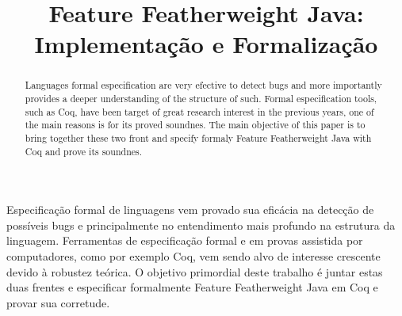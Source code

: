 \documentclass[bacharelado]{unb-cic}
\title{Feature Featherweight Java: Implementação e Formalização}
\begin{document}
  \maketitle
  \pretextual



  \begin{resumo}
  Especificação formal de linguagens vem provado sua eficácia na detecção de possíveis bugs e principalmente no entendimento mais profundo na estrutura da linguagem. Ferramentas de especificação formal e em provas assistida por computadores, como por exemplo Coq, vem sendo alvo de interesse crescente devido à robustez teórica. O objetivo primordial deste trabalho é juntar estas duas frentes e especificar formalmente Feature Featherweight Java em Coq e provar sua corretude.
  \end{resumo}

  \begin{abstract}
  Languages formal especification are very efective to detect bugs and more importantly provides a deeper understanding of the structure of such. Formal especification tools, such as Coq, have been target of great research interest in the previous years, one of the main reasons is for its proved soundnes. The main objective of this paper is to bring together these two front and specify formaly Feature Featherweight Java with Coq and prove its soundnes.
  \end{abstract}

  \tableofcontents

  \textual
  

  \postextual
  
  
\end{document}
